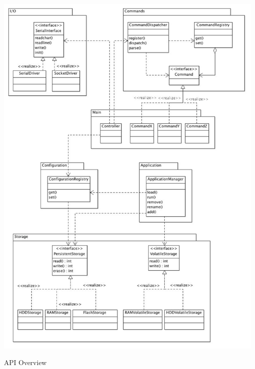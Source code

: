 \begin{DoxyImage}
\includegraphics[width=\textwidth]{APIOverview}
\caption{API Overview}
\end{DoxyImage}
 
